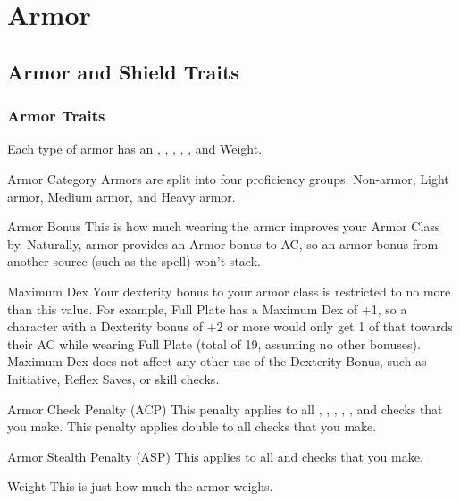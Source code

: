 \section{Armor}


\subsection{Armor and Shield Traits}

\subsubsection{Armor Traits}

Each type of armor has an , , , , , and Weight.

\begin{description*}
\item[Armor Category] Armors are split into four proficiency groups. Non-armor, Light armor, Medium armor, and Heavy armor.
\item[Armor Bonus] This is how much wearing the armor improves your Armor Class by. Naturally, armor provides an Armor bonus to AC, so an armor bonus from another source (such as the  spell) won't stack.
\item[Maximum Dex] Your dexterity bonus to your armor class is restricted to no more than this value. For example, Full Plate has a Maximum Dex of +1, so a character with a Dexterity bonus of +2 or more would only get 1 of that towards their AC while wearing Full Plate (total of 19, assuming no other bonuses). Maximum Dex does not affect any other use of the Dexterity Bonus, such as Initiative, Reflex Saves, or skill checks.
\item[Armor Check Penalty (ACP)] This penalty applies to all , , , , , and  checks that you make. This penalty applies double to all  checks that you make.
\item[Armor Stealth Penalty (ASP)] This applies to all  and  checks that you make.
\item[Weight] This is just how much the armor weighs.
\end{description*}


